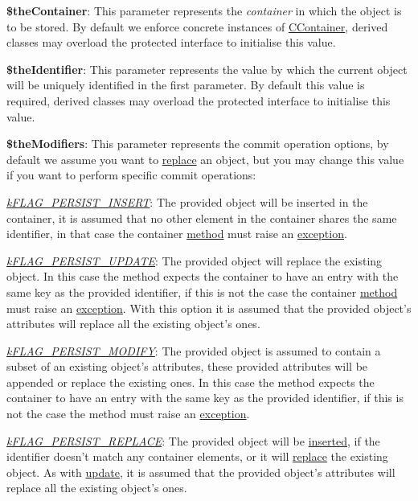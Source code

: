 \begin{DoxyItemize}
\item {\bfseries \$the\-Container}\-: This parameter represents the {\itshape container} in which the object is to be stored. By default we enforce concrete instances of \hyperlink{class_c_container}{C\-Container}, derived classes may overload the protected interface to initialise this value. 
\item {\bfseries \$the\-Identifier}\-: This parameter represents the value by which the current object will be uniquely identified in the first parameter. By default this value is required, derived classes may overload the protected interface to initialise this value. 
\item {\bfseries \$the\-Modifiers}\-: This parameter represents the commit operation options, by default we assume you want to \hyperlink{}{replace} an object, but you may change this value if you want to perform specific commit operations\-: 
\begin{DoxyItemize}
\item {\itshape \hyperlink{}{k\-F\-L\-A\-G\-\_\-\-P\-E\-R\-S\-I\-S\-T\-\_\-\-I\-N\-S\-E\-R\-T}}\-: The provided object will be inserted in the container, it is assumed that no other element in the container shares the same identifier, in that case the container \hyperlink{class_c_container_a4847dc676d1f7704e75f8981e927508a}{method} must raise an \hyperlink{}{exception}. 
\item {\itshape \hyperlink{}{k\-F\-L\-A\-G\-\_\-\-P\-E\-R\-S\-I\-S\-T\-\_\-\-U\-P\-D\-A\-T\-E}}\-: The provided object will replace the existing object. In this case the method expects the container to have an entry with the same key as the provided identifier, if this is not the case the container \hyperlink{class_c_container_a4847dc676d1f7704e75f8981e927508a}{method} must raise an \hyperlink{}{exception}. With this option it is assumed that the provided object's attributes will replace all the existing object's ones. 
\item {\itshape \hyperlink{}{k\-F\-L\-A\-G\-\_\-\-P\-E\-R\-S\-I\-S\-T\-\_\-\-M\-O\-D\-I\-F\-Y}}\-: The provided object is assumed to contain a subset of an existing object's attributes, these provided attributes will be appended or replace the existing ones. In this case the method expects the container to have an entry with the same key as the provided identifier, if this is not the case the method must raise an \hyperlink{}{exception}. 
\item {\itshape \hyperlink{}{k\-F\-L\-A\-G\-\_\-\-P\-E\-R\-S\-I\-S\-T\-\_\-\-R\-E\-P\-L\-A\-C\-E}}\-: The provided object will be \hyperlink{}{inserted}, if the identifier doesn't match any container elements, or it will \hyperlink{}{replace} the existing object. As with \hyperlink{}{update}, it is assumed that the provided object's attributes will replace all the existing object's ones. 

\end{DoxyItemize}
\end{DoxyItemize}
